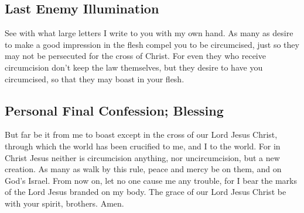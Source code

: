 \hypertarget{last-enemy-illumination}{%
\subsection{Last Enemy Illumination}\label{last-enemy-illumination}}

 See with what large letters I write to you with my own
hand.  As many as desire to make a good impression in the
flesh compel you to be circumcised, just so they may not be persecuted
for the cross of Christ.  For even they who receive
circumcision don't keep the law themselves, but they desire to have you
circumcised, so that they may boast in your flesh.

\hypertarget{personal-final-confession-blessing}{%
\subsection{Personal Final Confession;
Blessing}\label{personal-final-confession-blessing}}

 But far be it from me to boast except in the cross of
our Lord Jesus Christ, through which the world has been crucified to me,
and I to the world.  For in Christ Jesus neither is
circumcision anything, nor uncircumcision, but a new creation.
 As many as walk by this rule, peace and mercy be on
them, and on God's Israel.  From now on, let no one cause
me any trouble, for I bear the marks of the Lord Jesus branded on my
body.  The grace of our Lord Jesus Christ be with your
spirit, brothers. Amen.
